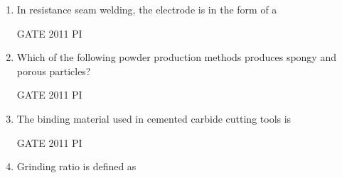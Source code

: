 \documentclass[journal,12pt,onecolumn]{IEEEtran}
\theoremstyle{remark}
\begin{document}
\begin{enumerate}
\begin{enumerate}
\end{enumerate}

\item In resistance seam welding, the electrode is in the form of a  

\hfill GATE 2011 PI  

\begin{enumerate}
\end{enumerate}

\item Which of the following powder production methods produces spongy and porous particles?  

\hfill GATE 2011 PI  

\begin{enumerate}
\end{enumerate}

\item The binding material used in cemented carbide cutting tools is  

\hfill GATE 2011 PI  

\begin{enumerate}
\end{enumerate}
\item Grinding ratio is defined as  


\end{enumerate}
\end{document}

